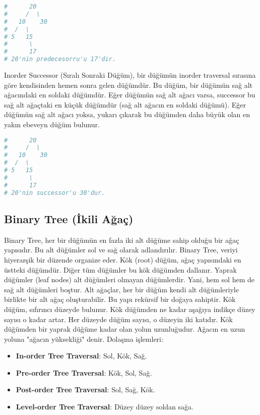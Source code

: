 \begin{lstlisting}[language=Python]
#      20
#     /  \
#   10    30
#  /  \
# 5   15
#      \
#      17
# 20'nin predecesorru'u 17'dir.
\end{lstlisting}

Inorder Successor (Sıralı Sonraki Düğüm), bir düğümün inorder traversal sırasına göre kendisinden hemen sonra gelen düğümdür. Bu düğüm, bir düğümün sağ alt ağacındaki en soldaki düğümdür. Eğer düğümün sağ alt ağacı varsa, successor bu sağ alt ağaçtaki en küçük düğümdür (sağ alt ağacın en soldaki düğümü). Eğer düğümün sağ alt ağacı yoksa, yukarı çıkarak bu düğümden daha büyük olan en yakın ebeveyn düğüm bulunur.

\begin{lstlisting}[language=Python]
#      20
#     /  \
#   10    30
#  /  \
# 5   15
#      \
#      17
# 20'nin successor'u 30'dur.
\end{lstlisting}

\newpage

\subsection{Binary Tree (İkili Ağaç)}

Binary Tree, her bir düğümün en fazla iki alt düğüme sahip olduğu bir ağaç yapısıdır. Bu alt düğümler sol ve sağ olarak adlandırılır. Binary Tree, veriyi hiyerarşik bir düzende organize eder. Kök (root) düğüm, ağaç yapısındaki en üstteki düğümdür. Diğer tüm düğümler bu kök düğümden dallanır. Yaprak düğümler (leaf nodes) alt düğümleri olmayan düğümlerdir. Yani, hem sol hem de sağ alt düğümleri boştur. Alt ağaçlar, her bir düğüm kendi alt düğümleriyle birlikte bir alt ağaç oluşturabilir. Bu yapı rekürsif bir doğaya sahiptir. Kök düğüm, sıfırıncı düzeyde bulunur. Kök düğümden ne kadar aşağıya indikçe düzey sayısı o kadar artar. Her düzeyde düğüm sayısı, o düzeyin iki katıdır. Kök düğümden bir yaprak düğüme kadar olan yolun uzunluğudur. Ağacın en uzun yoluna "ağacın yüksekliği" denir. Dolaşma işlemleri:

\begin{itemize}
    \item \textbf{In-order Tree Traversal}: Sol, Kök, Sağ.
    \item \textbf{Pre-order Tree Traversal}: Kök, Sol, Sağ.
    \item \textbf{Post-order Tree Traversal}: Sol, Sağ, Kök.
    \item \textbf{Level-order Tree Traversal}: Düzey düzey soldan sağa.
\end{itemize}

